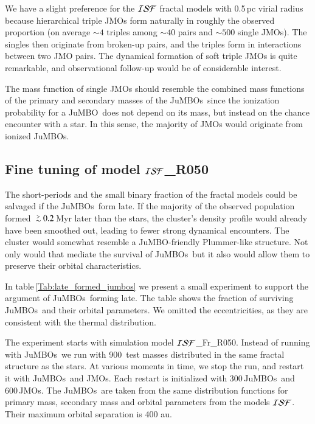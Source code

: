 \documentclass[submission,phys]{lib/SciPost}
\def\apgt{\ {\raise-.5ex\hbox{$\buildrel>\over\sim$}}\ }
\newcommand{\jumbo}{\mbox{JuMBO}}
\newcommand{\jumbos}{\mbox{JuMBOs}}
\begin{document}
We have a slight preference for the ${\cal ISF}$ fractal models with
0.5\,pc virial radius because hierarchical triple JMOs form naturally
in roughly the observed proportion (on average $\sim 4$ triples among
$\sim 40$ pairs and $\sim 500$ single JMOs). The singles then
originate from broken-up pairs, and the triples form in interactions
between two JMO pairs.  The dynamical formation of soft triple JMOs is
quite remarkable, and observational follow-up would be of considerable
interest.

The mass function of single JMOs should resemble the combined mass functions 
of the primary and secondary masses of the \jumbos\, since the ionization 
probability for a \jumbo\, does not depend on its mass, but instead on the 
chance encounter with a star. In this sense, the majority of JMOs would originate
from ionized \jumbos.  


\subsection{Fine tuning of model ${\cal ISF}$\_R050}\label{Sect:Disc:finetuning}

The short-periods and the small binary fraction of the fractal models
could be salvaged if the \jumbos\, form late. If the majority of the
observed population formed $\apgt 0.2$\,Myr later than the stars, the
cluster's density profile would already have been smoothed out,
leading to fewer strong dynamical encounters. The cluster would
somewhat resemble a \jumbo -friendly Plummer-like structure. Not only
would that mediate the survival of \jumbos\, but it also would allow
them to preserve their orbital characteristics.

In table\,\ref{Tab:late_formed_jumbos} we present a small experiment
to support the argument of \jumbos\, forming late.  The table shows the
fraction of surviving \jumbos\, and their orbital parameters. We omitted
the eccentricities, as they are consistent with the thermal
distribution.

The experiment starts with simulation model ${\cal ISF}$\_Fr\_R050.
Instead of running with \jumbos\, we run with 900\, test masses
distributed in the same fractal structure as the stars.  At various
moments in time, we stop the run, and restart it with \jumbos\, and
JMOs.  Each restart is initialized with 300\,\jumbos\, and 600\,JMOs.
The \jumbos\, are taken from the same distribution functions for
primary mass, secondary mass and orbital parameters from the models
${\cal ISF}$. Their maximum orbital separation is 400 au.
\end{document}

